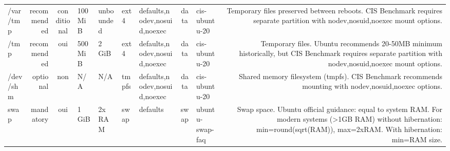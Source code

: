 \documentclass[10pt,a4paper]{article}
\begin{document}
{\begin{longtable}{M R S Z Z T O C I N}
/var/tmp & \textcolor{cHigh}{recommended} & conditional & 100 MiB & unbounded & ext4 & defaults,nodev,nosuid,noexec & data & cis-ubuntu-20 & Temporary files preserved between reboots. CIS Benchmark requires separate partition with nodev,nosuid,noexec mount options.\\
/tmp & \textcolor{cHigh}{recommended} & \textcolor{cOk}{oui} & 500 MiB & 2 GiB & ext4 & defaults,nodev,nosuid,noexec & data & cis-ubuntu-20 & Temporary files. Ubuntu recommends 20-50MB minimum historically, but CIS Benchmark requires separate partition with nodev,nosuid,noexec mount options.\\
/dev/shm & \textcolor{cLow}{optional} & non & N/A & N/A & tmpfs & defaults,nodev,nosuid,noexec & data & cis-ubuntu-20 & Shared memory filesystem (tmpfs). CIS Benchmark recommends mounting with nodev,nosuid,noexec options.\\
swap & \textcolor{cBlock}{mandatory} & \textcolor{cOk}{oui} & 1 GiB & 2x RAM & swap & defaults & swap & ubuntu-swap-faq & Swap space. Ubuntu official guidance: equal to system RAM. For modern systems (>1GB RAM) without hibernation: min=round(sqrt(RAM)), max=2xRAM. With hibernation: min=RAM size.\\
\bottomrule\end{longtable}}
\end{document}
